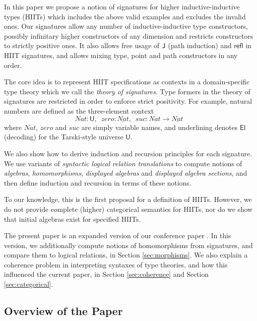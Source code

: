 \documentclass[dvipsnames]{lmcs} %
\newcommand{\U}{\mathsf{U}}
\newcommand{\El}{\mathsf{El}}
\newcommand{\ra}{\rightarrow}
\newcommand{\refl}{\mathsf{refl}}
\newcommand{\1}{\mathsf{1}} \renewcommand{\Pr}{\mathsf{Pr}}
\theoremstyle{plain}\newtheorem{satz}[thm]{Satz} %
\begin{document}
In this paper we propose a notion of signatures for higher inductive-inductive
types (HIITs) which includes the above valid examples and excludes the invalid
ones. Our signatures allow any number of inductive-inductive type constructors,
possibly infinitary higher constructors of any dimension and restricts
constructors to strictly positive ones. It also allows free usage of $\mathsf{J}$ (path
induction) and $\refl$ in HIIT signatures, and allows mixing type, point and path
constructors in any order.

The core idea is to represent HIIT specifications as contexts in a
domain-specific type theory which we call the \emph{theory of signatures}. Type
formers in the theory of signatures are restricted in order to enforce strict
positivity. For example, natural numbers are defined as the three-element
context
\[
  Nat:\U,\,\,\, zero:\underline{Nat},\,\,\, suc : Nat \ra \underline{Nat}
\]
where $Nat$, $zero$ and $suc$ are simply variable names, and underlining
denotes $\El$ (decoding) for the Tarski-style universe $\U$.

We also show how to derive induction and recursion principles for each
signature. We use variants of \emph{syntactic logical relation translations} to
compute notions of \emph{algebras}, \emph{homomorphisms}, \emph{displayed
  algebras} and \emph{displayed algebra sections}, and then define induction and
recursion in terms of these notions.

To our knowledge, this is the first proposal for a definition of
HIITs. However, we do not provide complete (higher) categorical semantics
for HIITs, nor do we show that initial algebras exist for specified HIITs.

The present paper is an expanded version of our conference paper \cite{hiit}.
In this version, we additionally compute notions of homomorphisms from
signatures, and compare them to logical relations, in Section
\ref{sec:morphisms}. We also explain a coherence problem in interpreting
syntaxes of type theories, and how this influenced the current paper, in Section
\ref{sec:coherence} and Section \ref{sec:categorical}.

\subsection{Overview of the Paper}
\end{document}
